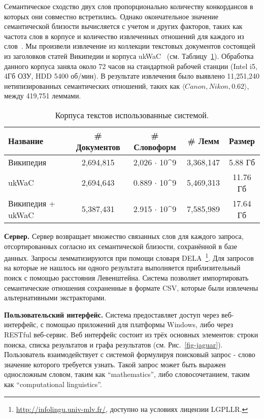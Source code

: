 \documentclass[a4paper,10pt,twoside]{article}
\begin{document}
Семантическое сходство двух слов пропорционально количеству конкордансов в которых они совместно встретились. Однако окончательное значение семантической близости вычисляется с учетом и других факторов, таких как частота слов в корпусе и количество извлеченных отношений для каждого из слов~\cite{panchenko2012konvens}. Мы произвели извлечение из коллекции текстовых документов состоящей из заголовков статей Википедии и корпуса ukWaC~\cite{baroni2009wacky} (см. Таблицу~\ref{tbl:corpora}). Обработка данного корпуса заняла около 72 часов на стандартной рабочей станции (Intel i5, 4Гб ОЗУ, HDD 5400 об/мин). В результате извлечения было выявлено 11,251,240 нетипизированных семантических отношений, таких как  $\langle Canon, Nikon, 0.62 \rangle$, между 419,751 леммами. 

\begin{table}
\centering
\footnotesize
\begin{tabular}{|l|c|c|c|c|}
  \hline              
  Название & \# Документов & \# Словоформ & \# Лемм &  Размер \\ \hline         \hline           
  Википедия & 2,694,815 & 2,026 $\cdot$ 10^9 & 3,368,147 & 5.88 Гб \\
  ukWaC & 2,694,643 & 0.889 $\cdot$ 10^9 & 5,469,313 & 11.76 Гб \\ 
  Википедия + ukWaC & 5,387,431 & 2.915 $\cdot$ 10^9 & 7,585,989 & 17.64 Гб\\
  \hline  
\end{tabular}
\caption{Корпуса текстов использованные системой.}
\label{tbl:corpora}
\end{table}

\textbf{Сервер.} Сервер возвращает множество связанных слов для каждого запроса, отсортированных согласно их семантической близости, сохранённой в базе данных. Запросы лемматизируются при помощи словаря DELA~\footnote{\url{http://infolingu.univ-mlv.fr/}, доступно на условиях лицензии LGPLLR.}. Для запросов на которые не нашлось ни одного результата выполняется приблизительный поиск с помощью расстояния Левенштейна. Система позволяет импортировать семантические отношения сохраненные в формате CSV, которые были извлечены альтернативными экстракторами.

\textbf{Пользовательский интерфейс.} Система предоставляет доступ через веб-интерфейс, с помощью приложений для платформы Windows, либо через RESTful веб-сервис. Веб интерфейс состоит из трёх основных элементов: строки поиска, списка результатов и графа результатов (см. Рис.~\ref{fig-jaguar}). Пользователь взаимодействует с системой формулируя поисковый запрос - слово значение которого требуется узнать. Такой запрос может быть выражен односложным словом, таким как ``mathematics'', либо словосочетанием, таким как ``computational linguistics''. 
\end{document}
